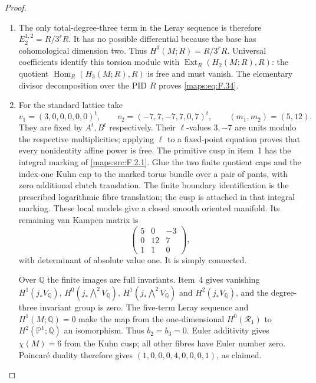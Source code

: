 \documentclass[11pt,a4paper]{article}
\numberwithin{equation}{section}
\theoremstyle{definition}
\begin{document}
\begin{proof}
\begin{enumerate}[label=\arabic*.]
Write $\mathcal R_q=R^qf_*R$.  The stalk/fibre
identification is proper base change
\cite[Tag 09V5, Lemma 20.18.1; chapter PDF p.~30]{StacksProject}.
The local maps of item~3 give
\[
 0\longrightarrow\mathcal R_2\longrightarrow j_*L_2
 \longrightarrow Q\longrightarrow0,
 \qquad Q_{p_2}=R/3^rR,
\]
with no other support.  Hence its connecting homomorphism gives
$H^1(\mathcal R_2)=R/3^rR$.
The degree-one quotient is also point supported, so
$H^2(\mathcal R_1)=H^2(j_*L_1)=0$.
The degree-three sheaf map is injective, so
$H^0(\mathcal R_3)=0$.

\item The only total-degree-three term in the Leray sequence
\cite[Tag 01F2, Lemma 20.13.4; chapter PDF p.~22]{StacksProject} is therefore
$E_2^{1,2}=R/3^rR$.  It has no possible differential because
the base has cohomological dimension two.  Thus
$H^3(M;R)=R/3^rR$.
Universal coefficients
\cite[Theorem 3.2, p.~195]{Hatcher2002} identify this torsion
module with $\operatorname{Ext}_R(H_2(M;R),R)$: the quotient
$\operatorname{Hom}_R(H_3(M;R),R)$ is free and must vanish.
The elementary divisor decomposition over the PID $R$ proves
\eqref{maps:eq:F.34}.

\item For the standard lattice take
\[
 v_1=(3,0,0,0,0,0)^t,\qquad
 v_2=(-7,7,-7,7,0,7)^t,\qquad (m_1,m_2)=(5,12).
\]
They are fixed by $A^t,B^t$ respectively.
Their $\ell$-values $3,-7$ are units modulo the respective
multiplicities; applying $\ell$ to a fixed-point equation proves
that every nonidentity affine power is free.
The primitive cusp in item~1 has the integral marking of
\cref{maps:src:F.2.1}.  Glue the two finite quotient caps and
the index-one Kuhn cap to the marked torus bundle over a pair
of pants, with zero additional clutch translation.  The finite
boundary identification is the prescribed logarithmic fibre
translation; the cusp is attached in that integral marking.
These local models give a closed smooth oriented
manifold.  Its remaining van Kampen matrix is
\[
 \begin{pmatrix}5&0&-3\\0&12&7\\1&1&0\end{pmatrix},
\]
with determinant of absolute value one.  It is simply connected.

Over $\mathbb Q$ the finite images are full invariants.
Item~4 gives vanishing $H^1(j_*V_{\mathbb Q})$,
$H^0(j_*\bigwedge^2V_{\mathbb Q})$,
$H^1(j_*\bigwedge^2V_{\mathbb Q})$ and
$H^2(j_*V_{\mathbb Q})$, and the degree-three invariant group
is zero.  The five-term Leray sequence and $H^1(M;\mathbb Q)=0$
make the map from the one-dimensional $H^0(\mathcal R_1)$ to
$H^2(\mathbb P^1;\mathbb Q)$ an isomorphism.
Thus $b_2=b_3=0$.
Euler additivity gives $\chi(M)=6$ from the Kuhn cusp;
all other fibres have Euler number zero.
Poincar\'e duality therefore gives
$(1,0,0,0,4,0,0,0,1)$, as claimed.
\end{enumerate}
\end{proof}
\end{document}
